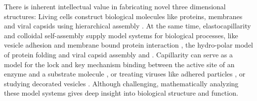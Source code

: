 %

There is inherent intellectual value in fabricating novel three dimensional structures: Living cells construct biological molecules like proteins, membranes and viral capsids using hierarchical assembly \cite{Whitesides2002}. At the same time, elastocapillarity and colloidal self-assembly supply model systems for biological processes, like vesicle adhesion and membrane bound protein interaction \cite{Dasgupta2017}, the hydro-polar model of protein folding \cite{Lau1989,Pandey2011} and viral capsid assembly and \cite{CASPAR1962}. Capillarity can serve as a model for the lock and key mechanism binding between the active site of an enzyme and a substrate molecule \cite{Araujo2018}, or treating viruses like adhered particles 
\cite{Agudo-Canalejo2017,Agudo-Canalejo2015,Deserno2004}, or studying decorated vesicles 
\cite{Auth2009,Weikl2002,Atilgan2007}. Although challenging, mathematically analyzing these model systems gives deep insight into biological structure and function.


